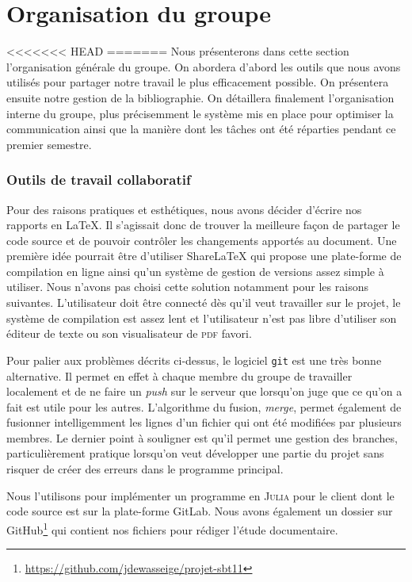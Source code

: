 \section{Organisation du groupe}
<<<<<<< HEAD
=======
Nous présenterons dans cette section l'organisation générale du groupe.
On abordera d'abord les outils que nous avons utilisés pour partager notre travail
le plus efficacement possible.
On présentera ensuite notre gestion de la bibliographie.
On détaillera finalement l'organisation interne du groupe,
plus précisemment le système mis en place pour optimiser la communication
ainsi que la manière dont les tâches ont été réparties pendant ce premier semestre.

\subsubsection*{Outils de travail collaboratif}
Pour des raisons pratiques et esthétiques, nous avons décider d'écrire
nos rapports en \LaTeX.
Il s'agissait donc de trouver la meilleure façon de partager le code source
et de pouvoir contrôler les changements apportés au document.
Une première idée pourrait être d'utiliser ShareLaTeX qui propose une plate-forme
de compilation en ligne ainsi qu'un système de gestion de versions
assez simple à utiliser.
Nous n'avons pas choisi cette solution notamment pour les raisons suivantes.
L'utilisateur doit être connecté dès qu'il veut travailler sur le projet,
le système de compilation est assez lent et l'utilisateur n'est pas libre
d'utiliser son éditeur de texte ou son visualisateur de \textsc{pdf} favori.

Pour palier aux problèmes décrits ci-dessus, le logiciel \texttt{git}
est une très bonne alternative.
Il permet en effet à chaque membre du groupe de travailler localement
et de ne faire un \emph{push} sur le serveur que lorsqu'on juge
que ce qu'on a fait est utile pour les autres.
L'algorithme du fusion, \emph{merge}, permet également de fusionner intelligemment
les lignes d'un fichier qui ont été modifiées par plusieurs membres.
Le dernier point à souligner est qu'il permet une gestion des branches,
particulièrement pratique lorsqu'on veut développer une partie du projet
sans risquer de créer des erreurs dans le programme principal.

Nous l'utilisons pour implémenter un programme en \textsc{Julia}
pour le client dont le code source est sur la plate-forme GitLab.
Nous avons également un dossier sur
GitHub\footnote{\url{https://github.com/jdewasseige/projet-sbt11}}
qui contient nos fichiers pour rédiger l'étude documentaire.

